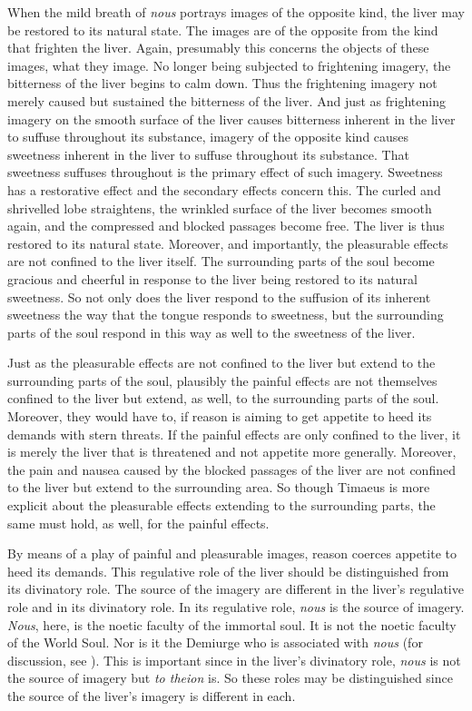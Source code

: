 When the mild breath of \emph{nous} portrays images of the opposite kind, the liver may be restored to its natural state. The images are of the opposite from the kind that frighten the liver. Again, presumably this concerns the objects of these images, what they image. No longer being subjected to frightening imagery, the bitterness of the liver begins to calm down. Thus the frightening imagery not merely caused but sustained the bitterness of the liver. And just as frightening imagery on the smooth surface of the liver causes bitterness inherent in the liver to suffuse throughout its substance, imagery of the opposite kind causes sweetness inherent in the liver to suffuse throughout its substance. That sweetness suffuses throughout is the primary effect of such imagery. Sweetness has a restorative effect and the secondary effects concern this. The curled and shrivelled lobe straightens, the wrinkled surface of the liver becomes smooth again, and the compressed and blocked passages become free. The liver is thus restored to its natural state. Moreover, and importantly, the pleasurable effects are not confined to the liver itself. The surrounding parts of the soul become gracious and cheerful in response to the liver being restored to its natural sweetness. So not only does the liver respond to the suffusion of its inherent sweetness the way that the tongue responds to sweetness, but the surrounding parts of the soul respond in this way as well to the sweetness of the liver. 

Just as the pleasurable effects are not confined to the liver but extend to the surrounding parts of the soul, plausibly the painful effects are not themselves confined to the liver but extend, as well, to the surrounding parts of the soul. Moreover, they would have to, if reason is aiming to get appetite to heed its demands with stern threats. If the painful effects are only confined to the liver, it is merely the liver that is threatened and not appetite more generally. Moreover, the pain and nausea caused by the blocked passages of the liver are not confined to the liver but extend to the surrounding area. So though Timaeus is more explicit about the pleasurable effects extending to the surrounding parts, the same must hold, as well, for the painful effects.

By means of a play of painful and pleasurable images, reason coerces appetite to heed its demands. This regulative role of the liver should be distinguished from its divinatory role. The source of the imagery are different in the liver's regulative role and in its divinatory role. In its regulative role, \emph{nous} is the source of imagery. \emph{Nous}, here, is the noetic faculty of the immortal soul. It is not the noetic faculty of the World Soul. Nor is it the Demiurge who is associated with \emph{nous} (for discussion, see \citealt{Menn:1992ez}). This is important since in the liver's divinatory role, \emph{nous} is not the source of imagery but \emph{to theion} is. So these roles may be distinguished since the source of the liver's imagery is different in each. 

